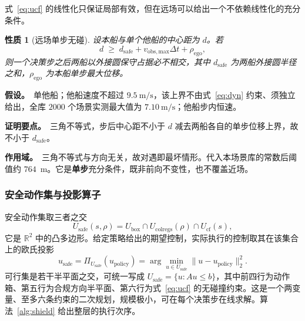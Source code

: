 \documentclass[12pt,letterpaper]{article}
\newtheorem{prop}{性质}
\begin{document}
式~\eqref{eq:ucf} 的线性化只保证局部有效，但在远场可以给出一个不依赖线性化的充分条件。
\begin{prop}[远场单步无碰]\label{prop:farfield}
设本船与单个他船的中心距为 $d$。若
\begin{equation}
 d \;\ge\; d_{\mathrm{safe}} + v_{\mathrm{obs,max}}\Delta t + \rho_{\mathrm{ego}},
 \label{eq:farfield}
\end{equation}
则一个决策步之后两船以外接圆保守占据必不相交，其中 $d_{\mathrm{safe}}$ 为两船外接圆半径之和，$\rho_{\mathrm{ego}}$ 为本船单步最大位移。
\end{prop}

\noindent\textbf{假设。}\ 单他船；他船速度不超过 $9.5~\mathrm{m/s}$，该上界不由式~\eqref{eq:dyn} 约束、须独立给出，全库 $2000$ 个场景实测最大值为 $7.10~\mathrm{m/s}$；他船步内恒速。

\noindent\textbf{证明要点。}\ 三角不等式，步后中心距不小于 $d$ 减去两船各自的单步位移上界，故不小于 $d_{\mathrm{safe}}$。

\noindent\textbf{作用域。}\ 三角不等式与方向无关，故对遇即最坏情形。代入本场景库的常数后阈值约 $764$~m。它是\textbf{单步}充分条件，既非前向不变性，也不覆盖近场。

\subsubsection{安全动作集与投影算子}

安全动作集取三者之交
\begin{equation}
 U_{\mathrm{safe}}(s,\rho)=U_{\mathrm{box}}\cap U_{\mathrm{colregs}}(\rho)\cap U_{\mathrm{cf}}(s),
 \label{eq:safeset}
\end{equation}
它是 $\mathbb{R}^2$ 中的凸多边形。给定策略给出的期望控制，实际执行的控制取其在该集合上的欧氏投影
\begin{equation}
 u_{\mathrm{safe}}=\Pi_{U_{\mathrm{safe}}}(u_{\mathrm{policy}})=\arg\min_{u\in U_{\mathrm{safe}}}\lVert u-u_{\mathrm{policy}}\rVert_2^2 .
 \label{eq:qp}
\end{equation}
可行集是若干半平面之交，可统一写成 $U_{\mathrm{safe}}=\{u:Au\le b\}$，其中前四行为动作箱、第五行为合规方向半平面、第六行为式~\eqref{eq:ucf} 的无碰撞约束。这是一个两变量、至多六条约束的二次规划，规模极小，可在每个决策步在线求解。算法~\ref{alg:shield} 给出整层的执行次序。
\end{document}
